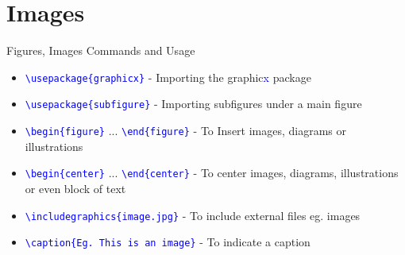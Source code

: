 \documentclass{beamer}
\begin{document}
	\section{Images}
	\begin{frame}{Figures, Images Commands and Usage}
		\begin{itemize}
			\item \texttt{\textcolor{blue}{\textbackslash usepackage\{graphicx\}}} - Importing the graphic\textcolor{blue}{x} package
			\item \texttt{\textcolor{blue}{\textbackslash usepackage\{subfigure\}}} - Importing subfigures under a main figure
			
			\item \texttt{\textcolor{blue}{\textbackslash begin\{figure\}}} ... \texttt{\textcolor{blue}{\textbackslash end\{figure\}}} - To Insert images, diagrams or illustrations
			\item \texttt{\textcolor{blue}{\textbackslash begin\{center\}}} ... \texttt{\textcolor{blue}{\textbackslash end\{center\}}} - To center images, diagrams, illustrations or even block of text
			
			\item \texttt{\textcolor{blue}{\textbackslash includegraphics\{image.jpg\}}} - To include external files eg. images
			\item \texttt{\textcolor{blue}{\textbackslash caption\{Eg. This is an image\}}} - To indicate a caption
			
			
		\end{itemize}
	\end{frame}
\end{document}
